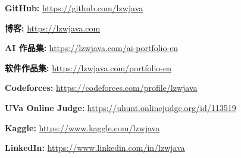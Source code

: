 
\begin{cventries}

  \cventry
    {} %
    {} %
    {} %
    {} %
    {
      \begin{cvitems}
        \item \textbf{GitHub:} \href{https://github.com/lzwjava}{https://github.com/lzwjava}
        \item \textbf{博客:} \href{https://lzwjava.com}{https://lzwjava.com}
        \item \textbf{AI 作品集:} \href{https://lzwjava.com/ai-portfolio-en}{https://lzwjava.com/ai-portfolio-en}
        \item \textbf{软件作品集:} \href{https://lzwjava.com/portfolio-en}{https://lzwjava.com/portfolio-en}
        \item \textbf{Codeforces:} \href{https://codeforces.com/profile/lzwjava}{https://codeforces.com/profile/lzwjava}
        \item \textbf{UVa Online Judge:} \href{https://uhunt.onlinejudge.org/id/113519}{https://uhunt.onlinejudge.org/id/113519}
        \item \textbf{Kaggle:} \href{https://www.kaggle.com/lzwjava}{https://www.kaggle.com/lzwjava}
        \item \textbf{LinkedIn:} \href{https://www.linkedin.com/in/lzwjava}{https://www.linkedin.com/in/lzwjava}
      \end{cvitems}
    }

\end{cventries}
